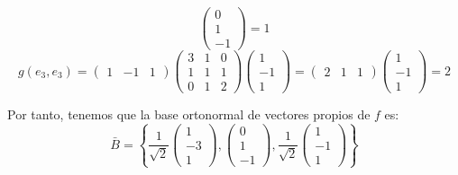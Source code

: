\documentclass[12pt]{article}
\begin{document}
\begin{ejercicio} 
\begin{enumerate}
\begin{equation*}
                \left(\begin{array}{c}
                    0\\1\\-1
                \end{array}\right) = 1
        \end{equation*}
        \begin{equation*}
            g(e_3, e_3) = \left(\begin{array}{ccc}
                    1&-1&1
                \end{array}\right)
                \left(\begin{array}{ccc}
                    3 & 1 & 0 \\
                    1 & 1 & 1 \\
                    0 & 1 & 2
                \end{array}\right)
                \left(\begin{array}{c}
                    1\\-1\\1
                \end{array}\right)
                =
                \left(\begin{array}{ccc}
                    2 & 1 & 1
                \end{array}\right)
                \left(\begin{array}{c}
                     1\\-1\\1
                \end{array}\right) = 2
        \end{equation*}

        Por tanto, tenemos que la base ortonormal de vectores propios de $f$ es:
        \begin{equation*}
            \bar{B}=\left\{
            \frac{1}{\sqrt{2}} 
            \left(\begin{array}{c}
                    1\\-3\\1
                \end{array}\right),
            \left(\begin{array}{c}
                    0\\1\\-1
                \end{array}\right),
            \frac{1}{\sqrt{2}}
            \left(\begin{array}{c}
                    1\\-1\\1
                \end{array}\right)
            \right\}
        \end{equation*}
    \end{enumerate}
\end{ejercicio}
\end{document}
